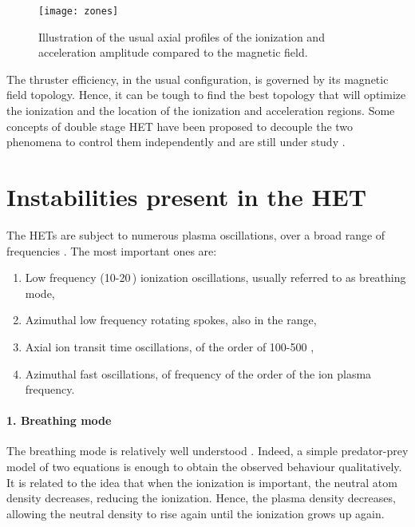   \begin{figure}[hbt]
    \centering
    \texttt{[image: zones]}
    \caption{Illustration of the usual axial profiles of the ionization and acceleration amplitude compared to the magnetic field.}
    \label{fig-zones}
  \end{figure}

  The thruster efficiency, in the usual configuration, is governed by its magnetic field topology.
  Hence, it can be tough to find the best topology that will optimize the ionization and the location of the ionization and acceleration regions.
  Some concepts of double stage \ac{HET} have been proposed to decouple the two phenomena to control them independently and are still under study \citep{dubois2018}.
  

  
  \section*{Instabilities present in the \acs{HET} }
  \label{sec-physics}

  The \ac{HET}s are subject to numerous plasma oscillations, over a broad range of frequencies \citep{boeuf2017,choueiri2001}.
  The most important ones are\string:
  \begin{enumerate}
    \item Low frequency (10-20\,\kilo\hertz) ionization oscillations, usually referred to as breathing mode,
    \item Azimuthal low frequency rotating spokes, also in the \kilo\hertz{} range,
    \item Axial ion transit time oscillations, of the order of 100-500 \kilo\hertz,
    \item Azimuthal fast oscillations, of frequency of the order of the ion plasma frequency.
  \end{enumerate} 

  \paragraph{1. Breathing mode\\}
  The breathing mode is relatively well understood \citep{boeuf1998,barral2009,hara2014}.
  Indeed, a simple predator-prey model of two equations is enough to obtain the observed behaviour qualitatively.
  It is related to the idea that when the ionization is important, the neutral atom density decreases, reducing the ionization.
  Hence, the plasma density decreases, allowing the neutral density to rise again until the ionization grows up again.

